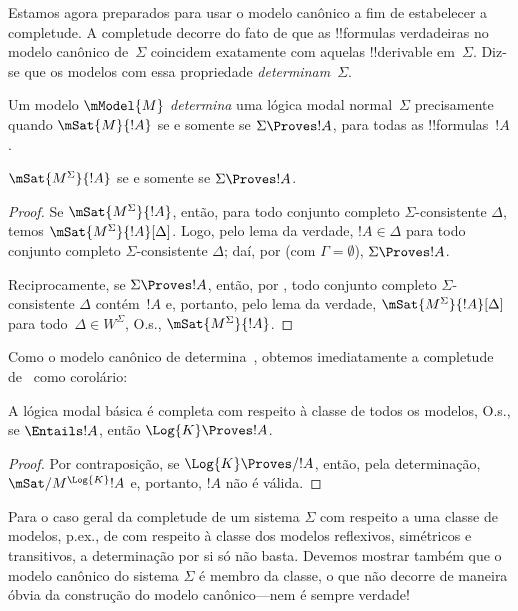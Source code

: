 \documentclass[../../../include/open-logic-section]{subfiles}
\begin{document}


Estamos agora preparados para usar o modelo canônico a fim de
estabelecer a completude. A completude decorre do fato de que as
!!{formula}s verdadeiras no modelo canônico de~$\Sigma$ coincidem
exatamente com aquelas !!{derivable} em~$\Sigma$. Diz-se que os modelos com essa
propriedade \emph{determinam}~$\Sigma$.

\begin{defn}
  Um modelo $\mModel{M}$ \emph{determina} uma lógica modal
  normal~$\Sigma$ precisamente quando $\mSat{M}{!A}$ se e somente se
  $\Sigma \Proves !A$, para todas as !!{formula}s~$!A$.
\end{defn}

\begin{thm}[Determinação]
   $\mSat{M^\Sigma}{!A}$ se e somente se $\Sigma \Proves !A$.
\end{thm}

\begin{proof}
  Se $\mSat{M^\Sigma}{!A}$, então, para todo conjunto completo
  $\Sigma$-consistente $\Delta$, temos
  $\mSat{M^\Sigma}{!A}[\Delta]$. Logo, pelo lema da verdade, $!A \in
  \Delta$ para todo conjunto completo $\Sigma$-consistente $\Delta$;
  daí, por  (com $\Gamma =
  \emptyset$), $\Sigma \Proves !A$.

  Reciprocamente, se $\Sigma \Proves !A$, então, por
  , todo
  conjunto completo $\Sigma$-consistente $\Delta$ contém~$!A$ e,
  portanto, pelo lema da verdade, $\mSat{M^\Sigma}{!A}[\Delta]$ para
  todo~$\Delta \in W^\Sigma$, O.s.\@, $\mSat{M^\Sigma}{!A}$.
\end{proof}

Como o modelo canônico de  determina~, obtemos
imediatamente a completude de~ como corolário:

\begin{cor}
  A lógica modal básica  é completa com respeito à
  classe de todos os modelos, O.s.\@, se $\Entails !A$, então $\Log{K}
  \Proves !A$.
\end{cor}

\begin{proof}
  Por contraposição, se $\Log{K} \Proves/ !A$, então, pela determinação,
  $\mSat/{M^{\Log{K}}}{!A}$ e, portanto, $!A$ não é válida.
\end{proof}

Para o caso geral da completude de um sistema $\Sigma$ com respeito a
uma classe de modelos, p.ex., de  com respeito à classe
dos modelos reflexivos, simétricos e transitivos, a determinação por si
só não basta. Devemos mostrar também que o modelo canônico do sistema
$\Sigma$ é membro da classe, o que não decorre de maneira óbvia da
construção do modelo canônico---nem é sempre verdade!
\end{document}

